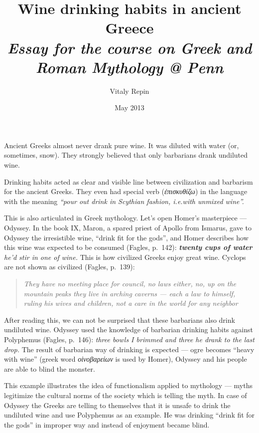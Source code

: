 \documentclass{article}
\title{Wine drinking habits in ancient Greece\\ \textit{\small Essay for the course on Greek and Roman Mythology @ Penn}}
\author{Vitaly Repin}
\date{May 2013}
\newcommand{\greek}[1]{{\selectlanguage{polutonikogreek}#1}}
\begin{document}
\maketitle
\newpage
\large
Ancient Greeks almost never drank pure wine. It was diluted with water (or, sometimes, snow). They strongly believed that only barbarians drank undiluted wine.

Drinking habits acted as clear and visible line between civilization and barbarism for the ancient Greeks.  They even had special verb (\textit{\greek{ἐπισκυθίζω}}) in the language
with the meaning \textit{``pour out drink in Scythian fashion, i.e.with unmixed wine''.}

This is also articulated in Greek mythology.
Let's open Homer's masterpiece --- Odyssey.  In the book IX, Maron, a spared priest of Apollo from Ismarus, gave to Odyssey the irresistible wine, ``drink fit for the gods'', and Homer describes how
this wine was expected to be consumed (Fagles, p.~142): \textit{\textbf{twenty cups of water} he’d stir in one of wine.} This is how civilized Greeks enjoy great wine.
Cyclops are not shown as civilized (Fagles, p.~139):

\begin{quote}
\it
They have no meeting place for council, no laws either,
no, up on the mountain peaks they live in arching caverns ---
each a law to himself, ruling his wives and children,
not a care in the world for any neighbor
\end{quote}

After reading this, we can not be surprised that these barbarians also drink undiluted wine. Odyssey used the knowledge of barbarian drinking habits against
Polyphemus (Fagles, p.~146): \textit{three bowls I brimmed and three he drank to the last drop.} The result of barbarian way of drinking is expected --- ogre becomes ``heavy with wine''
(greek word \textit{\greek{οἰνοβαρείων}} is used by Homer), Odyssey and his people are able to blind the monster.

This example illustrates the idea of functionalism applied to mythology --- myths legitimize the cultural norms of the society which is telling the myth. In case of Odyssey the Greeks
are telling to themselves that it is unsafe to drink the undiluted wine and use Polyphemus as an example. He was drinking ``drink fit for the gods'' in improper way and instead of  enjoyment
became blind.
\end{document}
